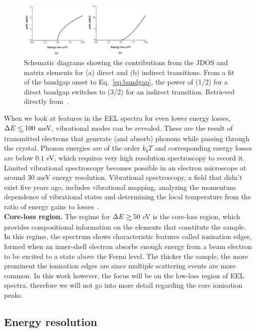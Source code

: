 \begin{figure}[H]
    \centering
    \includegraphics[width=0.6\textwidth]{plots/bandgap.png}
    \caption{Schematic diagrams showing the contributions from the JDOS and matrix elements for (a) direct and (b) indirect transitions. From a fit of the bandgap onset to Eq.~\ref{eq:bandgap}, the power of (1/2) for a direct bandgap switches
    to (3/2) for an indirect transition.
    Retrieved directly from~\cite{Rafferty:1998}.}
    \label{fig:bandgap}
\end{figure}



When we look at features in the EEL spectra for even lower energy losses, $\Delta E \lsim 100$ meV, 
vibrational modes can be revealed. 
%
These are the result of transmitted electrons that generate (and absorb) phonons 
while passing through the crystal. 
%
Phonon energies are of the order $k_bT$ and corresponding energy losses are below $0.1$ eV, 
which requires very high resolution spectroscopy to record it. 
%
Limited vibrational spectroscopy becomes possible in an electron microscope at around 30 meV 
energy resolution. 
%
Vibrational spectroscopy, a field that didn't exist five years ago, includes vibrational mapping, 
analyzing the momentum dependence of vibrational states and determining the local
temperature from the ratio of energy gains to losses~\cite{Krivanek:2009}.\\

{\bf Core-loss region.} The regime for $\Delta E \gsim 50$ eV is the core-loss region,
which provides compositional information
on the elements that constitute the sample. 
%
In this regime, the spectrum shows characteristic features called ionisation edges, 
formed when an inner-shell electron absorbs enough energy from a beam electron 
to be excited to a state above the Fermi level. 
%
The thicker the sample, the more prominent the ionisation edges are 
since multiple scattering events are more common. 
%
In this work however, the focus will be on the low-loss region of EEL spectra, 
therefore we will not go into more detail regarding the core ionisation peaks.


\subsection{Energy resolution}
\label{sec:energyresolution}

